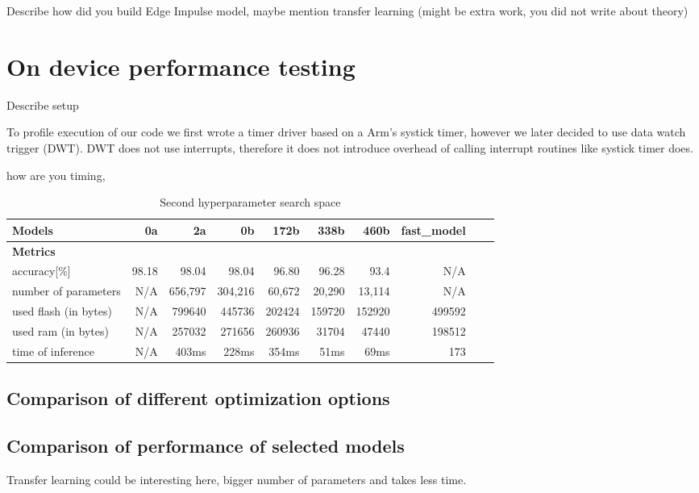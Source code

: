 Describe how did you build Edge Impulse model, maybe mention transfer learning (might be extra work, you did not write about theory)




\section{ On device performance testing}
Describe setup

To profile execution of our code we first wrote a timer driver based on a Arm's systick timer, however we later decided to use data watch trigger (DWT).
DWT does not use interrupts, therefore it does not introduce overhead of calling interrupt routines like systick timer does.


      how are you timing, 



\begin{table}
    \centering
    \caption{ Second hyperparameter search space}
    \begin{tabular}{ lrrrrrrrrr}\toprule
        \textbf{Models}                 &        0a &      2a &      0b &   172b &   338b &   460b &   fast_model\\\toprule
        \textbf{Metrics}                &&&&&\\\toprule
        accuracy[\%]                    &     98.18 &   98.04 &   98.04 &  96.80 &  96.28 &   93.4 &    N/A\\
        number of parameters            &       N/A & 656,797 & 304,216 & 60,672 & 20,290 & 13,114 &    N/A\\ 
        used flash (in bytes)           &       N/A &  799640 &  445736 & 202424 & 159720 & 152920 & 499592\\ 
        used ram   (in bytes)           &       N/A &  257032 &  271656 & 260936 &  31704 &  47440 & 198512\\ 
        time of inference               &       N/A &   403ms &   228ms &  354ms &   51ms &   69ms &    173\\ 
    \end{tabular}
    \label{precision_recall_table}
\end{table}



\subsection{ Comparison of different optimization options}
\subsection{ Comparison of performance of selected models}
    Transfer learning could be interesting here, bigger number of parameters and takes less time.






